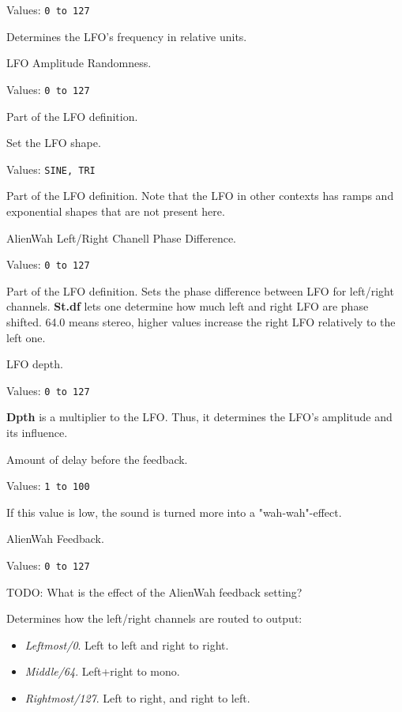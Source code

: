    Values: \texttt{0 to 127}

   Determines the LFO’s frequency in relative units.

   LFO Amplitude Randomness.

   Values: \texttt{0 to 127}

   Part of the LFO definition.

   Set the LFO shape.

   Values: \texttt{SINE, TRI}

   Part of the LFO definition.
   Note that the LFO in other contexts has ramps and exponential shapes that
   are not present here.

   AlienWah Left/Right Chanell Phase Difference.

   Values: \texttt{0 to 127}

   Part of the LFO definition.
   Sets the phase difference between LFO for left/right channels.
   \textbf{St.df} lets one determine how much left and right LFO are phase
   shifted.  64.0 means stereo, higher values increase the right LFO
   relatively to the left one.

   LFO depth.

   Values: \texttt{0 to 127}

   \textbf{Dpth} is a multiplier to the LFO. Thus, it determines
   the LFO's amplitude and its influence.

   Amount of delay before the feedback.

   Values: \texttt{1 to 100}

   If this value is low, the sound is turned more into a "wah-wah"-effect.

   AlienWah Feedback.

   Values: \texttt{0 to 127}

   TODO: What is the effect of the AlienWah feedback setting?

   Determines how the left/right channels are routed to output:

   \begin{itemize}
      \item \textsl{Leftmost/0}. Left to left and right to right.
      \item \textsl{Middle/64}. Left+right to mono.
      \item \textsl{Rightmost/127}. Left to right, and right to left.
   \end{itemize}

